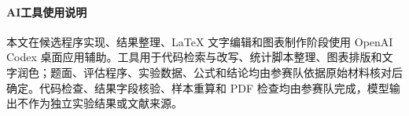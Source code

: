\paragraph*{AI工具使用说明}
\small 本文在候选程序实现、结果整理、\LaTeX{} 文字编辑和图表制作阶段使用 OpenAI Codex 桌面应用辅助。工具用于代码检索与改写、统计脚本整理、图表排版和文字润色；题面、评估程序、实验数据、公式和结论均由参赛队依据原始材料核对后确定。代码检查、结果字段核验、样本重算和 PDF 检查均由参赛队完成，模型输出不作为独立实验结果或文献来源。
